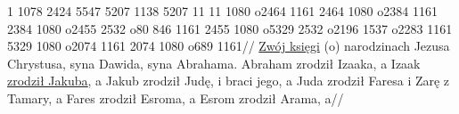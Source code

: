 \documentclass{article}
\newcommand\doubleline[1]{\underline{{\underline{#1}}}}
\newcommand{\vs}[1]{{\bfseries\versefont #1}}
\begin{document}
\exdisplay
\begingl
\lettrine[loversize=1,lraise=-1.3]{1 }{}%
 {} 1078 2424 5547 5207 1138 5207 11 {} 11 1080 o2464 1161 2464 1080 o2384 1161 2384 1080 o2455 2532 o80 846 {} 1161 2455 1080 o5329 2532 o2196 1537 o2283 1161 5329 1080 o2074 1161 2074 1080 o689 {} 1161//
\glb \underline{Zwój księgi} (o) narodzinach Jezusa Chrystusa, syna Dawida, syna Abrahama. \vs{2} Abraham zrodził Izaaka, a Izaak \doubleline{zrodził Jakuba}, a Jakub zrodził Judę, i braci jego, \vs{3} a Juda zrodził Faresa i Zarę z Tamary, a Fares zrodził Esroma, a Esrom zrodził Arama, \vs{4} a//
\endgl
\xe
\end{document}
